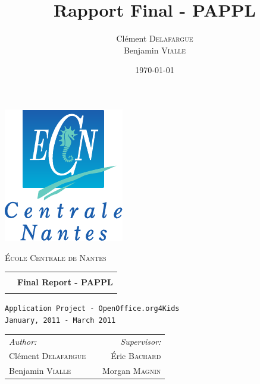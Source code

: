 \documentclass[a4paper,11pt]{article}
\title{Rapport Final - PAPPL} \author{Clément \textsc{Delafargue}\\Benjamin \textsc{Vialle}} \date{\today}
\begin{document}
	\begin{titlepage}

		\thispagestyle{empty}

		\begin{flushleft}
			\includegraphics[scale=0.8]{images/ECN.pdf}
		\end{flushleft}

		\vfill
		
		\begin{center}
			{\Large \textsc{École Centrale de Nantes}} \\

		\vspace{1cm}

		\begin{tabular}{p{0cm} c}
			\hline
			& \\
			& {\huge {\bfseries Final Report - PAPPL}} \\
			& \\
			\hline
		\end{tabular}

		\vspace{2.5cm}

		\texttt{{\large Application Project - OpenOffice.org4Kids}} \\
		\texttt{{\large January, 2011 - March 2011}} \\

		\vspace{2.5cm}

		\begin{tabular}{l c r}
			\large{\emph{Author:}} & \hspace{5cm} & \large{\emph{Supervisor:}} \\
			\large{Clément \textsc{Delafargue}} & \hspace{5cm} & \large{Éric \textsc{Bachard}}\\
			\large{Benjamin \textsc{Vialle}} & \hspace{5cm} & \large{Morgan \textsc{Magnin}}\\
		\end{tabular}


\end{center}
\end{titlepage}
\end{document}
